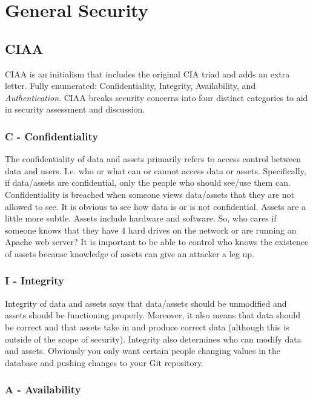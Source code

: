 
\section{General Security}
\subsection{CIAA}
CIAA is an initialism that includes the original CIA triad and adds an extra letter. Fully enumerated: Confidentiality, Integrity, Availability, and \textit{Authentication}.  CIAA breaks security concerns into four distinct categories to aid in security assessment and discussion.  

\subsubsection{C - Confidentiality}

The confidentiality of data and assets primarily refers to access control between data and users. I.e. who or what can or cannot access data or assets. Specifically, if data/assets are confidential, only the people who should see/use them can. Confidentiality is breached when someone views data/assets that they are not allowed to see. It is obvious to see how data is or is not confidential. Assets are a little more subtle. Assets include hardware and software. So, who cares if someone knows that they have 4 hard drives on the network or are running an Apache web server? It is important to be able to control who knows the existence of assets because knowledge of assets can give an attacker a leg up.

\subsubsection{I - Integrity}

Integrity of data and assets says that data/assets should be unmodified and assets should be functioning properly. Moreover, it also means that data should be correct and that assets take in and produce correct data (although this is outside of the scope of security). Integrity also determines who can modify data and assets. Obviously you only want certain people changing values in the database and pushing changes to your Git repository.

\subsubsection{A - Availability}

